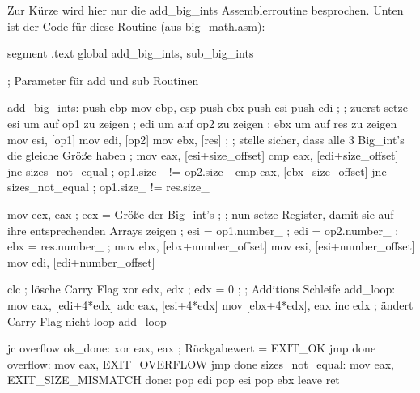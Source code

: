 Zur K\"{u}rze wird hier nur die {\code add\_big\_ints} Assemblerroutine
besprochen. Unten ist der Code f\"{u}r diese Routine (aus {\code
big\_math.asm}):
\begin{AsmCodeListing}[label=big\_math.asm, numbers=left, commandchars=\\\{\}]
 segment .text
 global  add_big_ints, sub_big_ints


 ; Parameter f\"{u}r add und sub Routinen

 add_big_ints:
     push    ebp
     mov     ebp, esp
     push    ebx
     push    esi
     push    edi
     ;
     ; zuerst setze esi um auf op1 zu zeigen
     ;              edi um auf op2 zu zeigen
     ;              ebx um auf res zu zeigen
     mov     esi, [op1]                                         \label{line:big_math.asm1}
     mov     edi, [op2]
     mov     ebx, [res]                                         \label{line:big_math.asm2}
     ;
     ; stelle sicher, dass alle 3 Big_int's die gleiche Gr\"{o}{\ss}e haben
     ;
     mov     eax, [esi+size_offset]                             \label{line:big_math.asm3}
     cmp     eax, [edi+size_offset]
     jne     sizes_not_equal          ; op1.size_ != op2.size_
     cmp     eax, [ebx+size_offset]
     jne     sizes_not_equal          ; op1.size_ != res.size_  \label{line:big_math.asm4}

     mov     ecx, eax                 ; ecx = Gr\"{o}{\ss}e der Big_int's
     ;
     ; nun setze Register, damit sie auf ihre entsprechenden Arrays zeigen
     ;      esi = op1.number_
     ;      edi = op2.number_
     ;      ebx = res.number_
     ;
     mov     ebx, [ebx+number_offset]                         \label{line:big_math.asm5}
     mov     esi, [esi+number_offset]
     mov     edi, [edi+number_offset]                         \label{line:big_math.asm6}

     clc                              ; l\"{o}sche Carry Flag
     xor     edx, edx                 ; edx = 0
     ;
     ; Additions Schleife
 add_loop:                                                      \label{line:big_math.asm7}
     mov     eax, [edi+4*edx]
     adc     eax, [esi+4*edx]
     mov     [ebx+4*edx], eax
     inc     edx                      ; \"{a}ndert Carry Flag nicht
     loop    add_loop                                           \label{line:big_math.asm8}

     jc      overflow                                           \label{line:big_math.asm9}
 ok_done:
     xor     eax, eax                 ; R\"{u}ckgabewert = EXIT_OK
     jmp     done
 overflow:
     mov     eax, EXIT_OVERFLOW
     jmp     done
 sizes_not_equal:
     mov     eax, EXIT_SIZE_MISMATCH
 done:
     pop     edi
     pop     esi
     pop     ebx
     leave
     ret
\end{AsmCodeListing}

